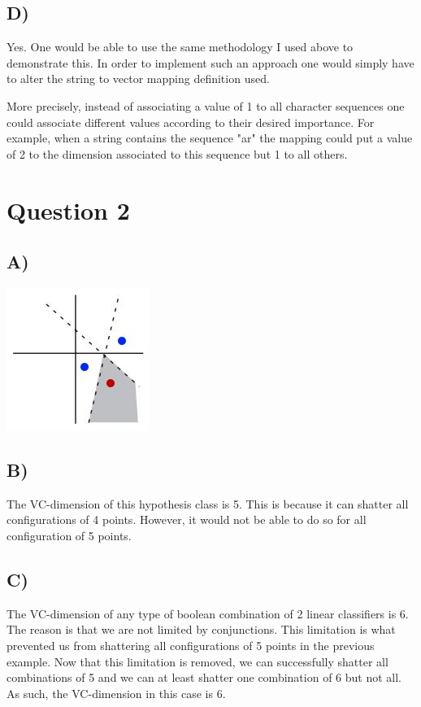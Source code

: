\documentclass{report}
\begin{document}
\subsection*{D)}
Yes. One would be able to use the same methodology I used above to demonstrate this.
In order to implement such an approach one would simply have to alter the string to vector
mapping definition used.

More precisely, instead of associating a value of 1 to all character
sequences one could associate different values according to their desired importance. For
example, when a string contains the sequence "ar" the mapping could put a value of 2
to the dimension associated to this sequence but 1 to all others.

\section*{Question 2}
\subsection*{A)}
\includegraphics[width=175px, keepaspectratio]{3points.jpg}
\subsection*{B)}
The VC-dimension of this hypothesis class is 5. This is because it can
shatter all configurations of 4 points. However, it would not be able to do so for all
configuration of 5 points.
\subsection*{C)}
The VC-dimension of any type of boolean combination of 2 linear classifiers is
6. The reason is that we are not limited by conjunctions. This limitation is what
prevented us from shattering all configurations of 5 points in the previous example.
Now that this limitation is removed, we can successfully shatter all combinations of 5
and we can at least shatter one combination of 6 but not all. As such, the VC-dimension
in this case is 6.
\end{document}
